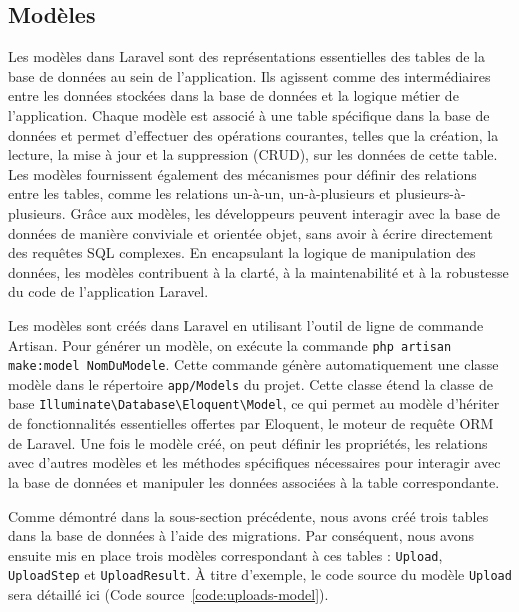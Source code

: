 \subsection{Modèles}

Les modèles dans Laravel sont des représentations essentielles des tables de la base de données au sein de l'application. Ils agissent comme des intermédiaires entre les données stockées dans la base de données et la logique métier de l'application. Chaque modèle est associé à une table spécifique dans la base de données et permet d'effectuer des opérations courantes, telles que la création, la lecture, la mise à jour et la suppression (CRUD), sur les données de cette table. Les modèles fournissent également des mécanismes pour définir des relations entre les tables, comme les relations un-à-un, un-à-plusieurs et plusieurs-à-plusieurs. Grâce aux modèles, les développeurs peuvent interagir avec la base de données de manière conviviale et orientée objet, sans avoir à écrire directement des requêtes SQL complexes. En encapsulant la logique de manipulation des données, les modèles contribuent à la clarté, à la maintenabilité et à la robustesse du code de l'application Laravel.

Les modèles sont créés dans Laravel en utilisant l'outil de ligne de commande Artisan. Pour générer un modèle, on exécute la commande \Verb|php artisan make:model NomDuModele|. Cette commande génère automatiquement une classe modèle dans le répertoire \Verb|app/Models| du projet. Cette classe étend la classe de base \Verb|Illuminate\Database\Eloquent\Model|, ce qui permet au modèle d'hériter de fonctionnalités essentielles offertes par Eloquent, le moteur de requête ORM de Laravel. Une fois le modèle créé, on peut définir les propriétés, les relations avec d'autres modèles et les méthodes spécifiques nécessaires pour interagir avec la base de données et manipuler les données associées à la table correspondante.

Comme démontré dans la sous-section précédente, nous avons créé trois tables dans la base de données à l'aide des migrations. Par conséquent, nous avons ensuite mis en place trois modèles correspondant à ces tables : \Verb|Upload|, \Verb|UploadStep| et \Verb|UploadResult|. À titre d'exemple, le code source du modèle \Verb|Upload| sera détaillé ici (Code source~\ref{code:uploads-model}).



